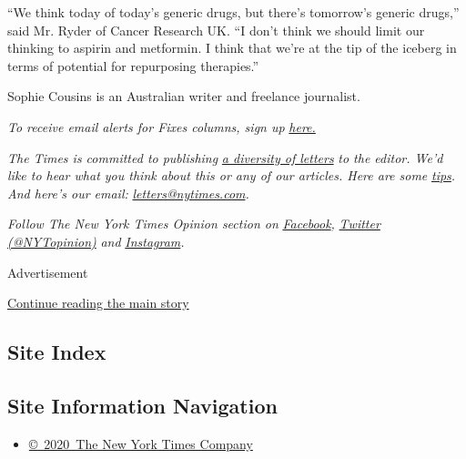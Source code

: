 ``We think today of today's generic drugs, but there's tomorrow's
generic drugs,'' said Mr. Ryder of Cancer Research UK. ``I don't think
we should limit our thinking to aspirin and metformin. I think that
we're at the tip of the iceberg in terms of potential for repurposing
therapies.''

Sophie Cousins is an Australian writer and freelance journalist.

\emph{To receive email alerts for Fixes columns, sign up}
\href{http://eepurl.com/ABIxL}{\emph{here.}}

\emph{The Times is committed to publishing}
\href{https://www.nytimes.com/2019/01/31/opinion/letters/letters-to-editor-new-york-times-women.html}{\emph{a
diversity of letters}} \emph{to the editor. We'd like to hear what you
think about this or any of our articles. Here are some}
\href{https://help.nytimes.com/hc/en-us/articles/115014925288-How-to-submit-a-letter-to-the-editor}{\emph{tips}}\emph{.
And here's our email:}
\href{mailto:letters@nytimes.com}{\emph{letters@nytimes.com}}\emph{.}

\emph{Follow The New York Times Opinion section on}
\href{https://www.facebook.com/nytopinion}{\emph{Facebook}}\emph{,}
\href{http://twitter.com/NYTOpinion}{\emph{Twitter (@NYTopinion)}}
\emph{and}
\href{https://www.instagram.com/nytopinion/}{\emph{Instagram}}\emph{.}

Advertisement

\protect\hyperlink{after-bottom}{Continue reading the main story}

\hypertarget{site-index}{%
\subsection{Site Index}\label{site-index}}

\hypertarget{site-information-navigation}{%
\subsection{Site Information
Navigation}\label{site-information-navigation}}

\begin{itemize}
\tightlist
\item
  \href{https://help.nytimes.com/hc/en-us/articles/115014792127-Copyright-notice}{©~2020~The
  New York Times Company}
\end{itemize}

